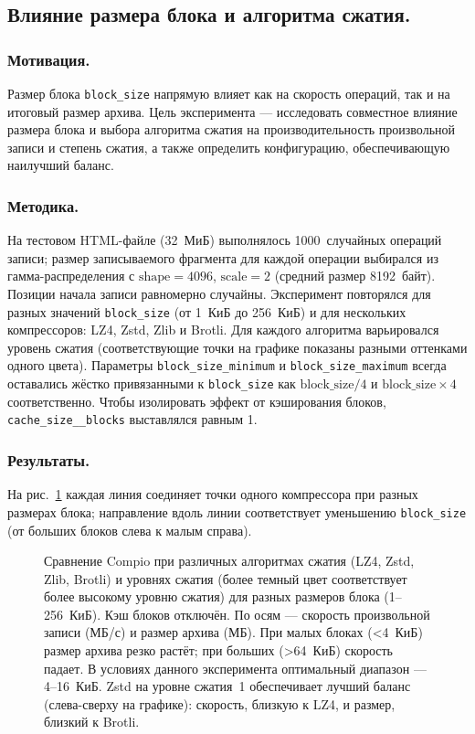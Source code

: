 \subsection{Влияние размера блока и алгоритма сжатия.}

\subsubsection{Мотивация.}
Размер блока \texttt{block\_size} напрямую влияет как на скорость операций, так и на итоговый размер архива. Цель эксперимента --- исследовать совместное влияние размера блока и выбора алгоритма сжатия на производительность произвольной записи и степень сжатия, а также определить конфигурацию, обеспечивающую наилучший баланс.

\subsubsection{Методика.}
На тестовом HTML-файле (32~МиБ) выполнялось 1000~случайных операций записи; размер записываемого фрагмента для каждой операции выбирался из гамма-распределения с $\mathrm{shape}=4096$, $\mathrm{scale}=2$ (средний размер 8192~байт). Позиции начала записи равномерно случайны. Эксперимент повторялся для разных значений \texttt{block\_size} (от 1~КиБ до 256~КиБ) и для нескольких компрессоров: LZ4, Zstd, Zlib и Brotli. Для каждого алгоритма варьировался уровень сжатия (соответствующие точки на графике показаны разными оттенками одного цвета). Параметры \texttt{block\_size\_minimum} и \texttt{block\_size\_maximum} всегда оставались жёстко привязанными к \texttt{block\_size} как $\mathrm{block\_size}/4$ и $\mathrm{block\_size}\times4$ соответственно. Чтобы изолировать эффект от кэширования блоков, \texttt{cache\_size\_\_blocks} выставлялся равным 1.

\subsubsection{Результаты.}
На рис.~\ref{fig:algorithms_no_cache} каждая линия соединяет точки одного компрессора при разных размерах блока; направление вдоль линии соответствует уменьшению \texttt{block\_size} (от больших блоков слева к малым справа).

\begin{figure}[h]
    \centering
    
    \caption{Сравнение Compio при различных алгоритмах сжатия (LZ4, Zstd, Zlib, Brotli) и уровнях сжатия (более темный цвет соответствует более высокому уровню сжатия) для разных размеров блока (1--256~КиБ). Кэш блоков отключён. По осям --- скорость произвольной записи (МБ/с) и размер архива (МБ). При малых блоках (<4~КиБ) размер архива резко растёт; при больших (>64~КиБ) скорость падает. В условиях данного эксперимента оптимальный диапазон --- 4--16~КиБ. Zstd на уровне сжатия~1 обеспечивает лучший баланс (слева-сверху на графике): скорость, близкую к LZ4, и размер, близкий к Brotli.}
    \label{fig:algorithms_no_cache}
\end{figure}

